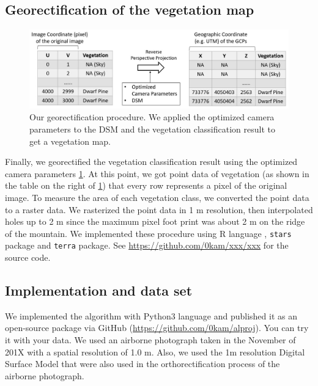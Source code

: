 \documentclass{article}
\begin{document}
\hypertarget{georectification-of-the-vegetation-map}{%
\subsection{Georectification of the vegetation map}\label{georectification-of-the-vegetation-map}}



\begin{figure}
\includegraphics[width=1\linewidth]{paper_files/figures/Slide6} \caption{Our georectification procedure. We applied the optimized camera parameters to the DSM and the vegetation classification result to get a vegetation map.}\label{fig:georec}
\end{figure}

Finally, we georectified the vegetation classification result using the optimized camera parameters \ref{fig:georec}. At this point, we got point data of vegetation (as shown in the table on the right of \ref{fig:georec}) that every row represents a pixel of the original image. To measure the area of each vegetation class, we converted the point data to a raster data. We rasterized the point data in 1 m resolution, then interpolated holes up to 2 m since the maximum pixel foot print was about 2 m on the ridge of the mountain. We implemented these procedure using R language \cite{RCore}, \texttt{stars} package \cite{Rstars} and \texttt{terra} \cite{Rterra} package. See \url{https://github.com/0kam/xxx/xxx} for the source code.

\hypertarget{implementation-and-data-set}{%
\subsection{Implementation and data set}\label{implementation-and-data-set}}

We implemented the algorithm with Python3 language and published it as an open-source package via GitHub (\url{https://github.com/0kam/alproj}). You can try it with your data. We used an airborne photograph taken in the November of 201X with a spatial resolution of 1.0 m. Also, we used the 1m resolution Digital Surface Model that were also used in the orthorectification process of the airborne photograph.
\end{document}
